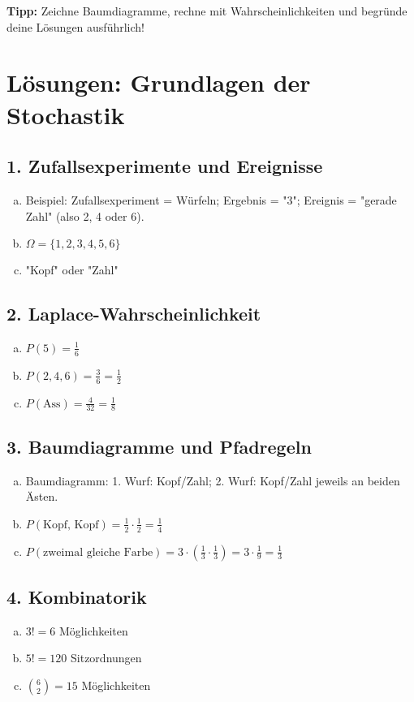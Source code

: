 \vspace{1em}
\textbf{Tipp:} Zeichne Baumdiagramme, rechne mit Wahrscheinlichkeiten und begründe deine Lösungen ausführlich!

\newpage

\section*{Lösungen: Grundlagen der Stochastik}

\subsection*{1. Zufallsexperimente und Ereignisse}
\begin{enumerate}[a)]
    \item Beispiel: Zufallsexperiment = Würfeln; Ergebnis = "3"; Ereignis = "gerade Zahl" (also 2, 4 oder 6).
    \item $\Omega = \{1,2,3,4,5,6\}$
    \item "Kopf" oder "Zahl"
\end{enumerate}

\subsection*{2. Laplace-Wahrscheinlichkeit}
\begin{enumerate}[a)]
    \item $P(5) = \frac{1}{6}$
    \item $P(2,4,6) = \frac{3}{6} = \frac{1}{2}$
    \item $P(\text{Ass}) = \frac{4}{32} = \frac{1}{8}$
\end{enumerate}

\subsection*{3. Baumdiagramme und Pfadregeln}
\begin{enumerate}[a)]
    \item Baumdiagramm: 1. Wurf: Kopf/Zahl; 2. Wurf: Kopf/Zahl jeweils an beiden Ästen.
    \item $P(\text{Kopf, Kopf}) = \frac{1}{2} \cdot \frac{1}{2} = \frac{1}{4}$
    \item $P(\text{zweimal gleiche Farbe}) = 3 \cdot \left(\frac{1}{3} \cdot \frac{1}{3}\right) = 3 \cdot \frac{1}{9} = \frac{1}{3}$
\end{enumerate}

\subsection*{4. Kombinatorik}
\begin{enumerate}[a)]
    \item $3! = 6$ Möglichkeiten
    \item $5! = 120$ Sitzordnungen
    \item $\binom{6}{2} = 15$ Möglichkeiten
\end{enumerate}

